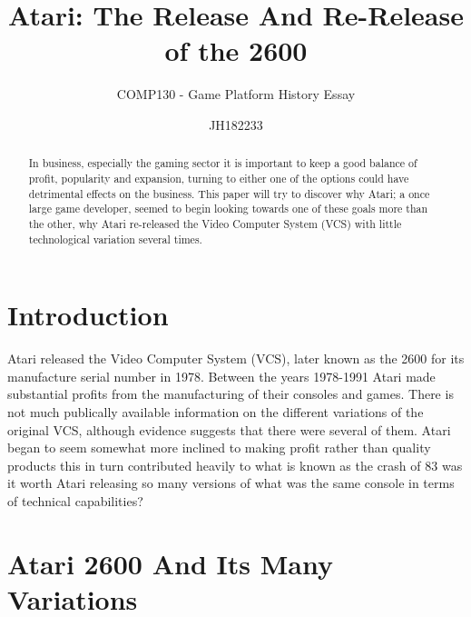 \documentclass{scrartcl}
\title{Atari: The Release And Re-Release of the 2600}
\subtitle{COMP130 - Game Platform History Essay}
\author{JH182233}
\begin{document}
\maketitle

\begin{abstract}
In business, especially the gaming sector it is important to keep a good balance of profit, popularity and expansion, turning to either one of the options could have detrimental effects on the business. This paper will try to discover why Atari; a once large game developer, seemed to begin looking towards one of these goals more than the other, why Atari re-released the Video Computer System (VCS) with little technological variation several times.
\end{abstract}

\newpage

\section{Introduction}

Atari released the Video Computer System (VCS), later known as the 2600 for its manufacture serial number in 1978\cite{atarii}. Between the years 1978-1991 Atari made substantial profits from the manufacturing of their consoles and games\cite{race}. There is not much publically available information on the different variations of the original VCS, although evidence suggests that there were several of them\cite{age}. Atari began to seem somewhat more inclined to making profit rather than quality products\cite{atarii} this in turn contributed heavily to what is known as the crash of 83\cite{ultimate} was it worth Atari releasing so many versions of what was the same console in terms of technical capabilities?
\newpage

\section{Atari 2600 And Its Many Variations}
\end{document}

